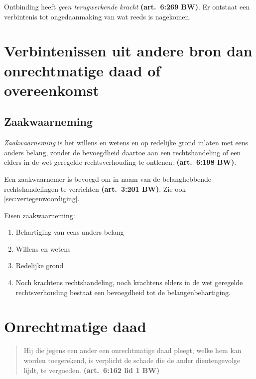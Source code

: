 \documentclass[a4paper]{article}
\newcommand{\art}[1]{\textbf{(art.~#1 BW)}\xspace}
\begin{document}
Ontbinding heeft \emph{geen terugwerkende kracht} \art{6:269}. Er ontstaat een
verbintenis tot ongedaanmaking van wat reeds is nagekomen.

\section{Verbintenissen uit andere bron dan onrechtmatige daad of overeenkomst}

\subsection{Zaakwaarneming}

\emph{Zaakwaarneming} is het willens en wetens en op redelijke grond inlaten
met eens anders belang, zonder de bevoegdheid daartoe aan een rechtshandeling
of een elders in de wet geregelde rechtsverhouding te ontlenen. \art{6:198}.

Een zaakwaarnemer is bevoegd om in naam van de belanghebbende
rechtshandelingen te verrichten \art{3:201}. Zie ook
\ref{sec:vertegenwoordiging}.

Eisen zaakwaarneming:
\begin{enumerate}
  \item Behartiging van eens anders belang
  \item Willens en wetens
  \item Redelijke grond
  \item Noch krachtens rechtshandeling, noch krachtens elders in de wet
    geregelde rechtsverhouding bestaat een bevoegdheid tot de
    belangenbehartiging.
\end{enumerate}

\section{Onrechtmatige daad}

\begin{quote}

  Hij die jegens een ander een onrechtmatige daad pleegt, welke hem kan worden
  toegerekend, is verplicht de schade die de ander dientengevolge lijdt, te
  vergoeden. \art{6:162 lid 1}

\end{quote}
\end{document}
